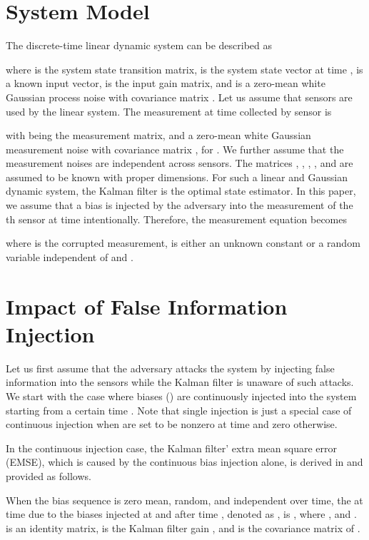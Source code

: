 \documentclass{article}
\begin{document}
\section{System Model}
\label{sec:sysmodel}
The discrete-time linear dynamic system can be described as 

where  is the system state transition matrix,  is the system state vector at time ,  is a known input vector,  is the input gain matrix, and  is a zero-mean white Gaussian process noise with covariance matrix . Let us assume that  sensors are used by the linear system. The measurement at time  collected by sensor  is

 with  being the measurement matrix, and  a zero-mean white Gaussian measurement noise with covariance matrix , for . We further assume that the measurement noises are independent across sensors. The matrices , , , , and  are assumed to be known with proper dimensions.
For such a linear and Gaussian dynamic system, the Kalman filter is the optimal state estimator. In this paper, we assume that a bias  is injected by the adversary into the measurement of the th  sensor at time  intentionally. Therefore, the measurement equation  becomes
  
where  is the corrupted measurement,  is either an unknown constant or a random variable independent of  and . 

\section{Impact of False Information Injection}
\label{sec:impact}
Let us first assume that the adversary attacks the system by injecting false information into the sensors while the Kalman filter is unaware of such attacks. We start with the case where biases () are continuously injected into the system starting from a certain time . Note that single injection is just a special case of continuous injection when  are set to be nonzero at time  and zero otherwise.

In the continuous injection case, the Kalman filter' extra mean square error (EMSE), which is caused by the continuous bias injection alone, is derived in \cite{niu:summer_ext_faculty_12} and provided as follows.  
\begin{proposition}
\label{lem:mse_bias_continuous}
When the  bias sequence  is zero mean, random, and independent over time, the  at time  due to the biases injected at and after time , denoted as ,  is , where , and .  is an identity matrix,  is the Kalman filter gain \cite{YBS:book}, and  is the covariance matrix of .
\end{proposition}
\end{document}
